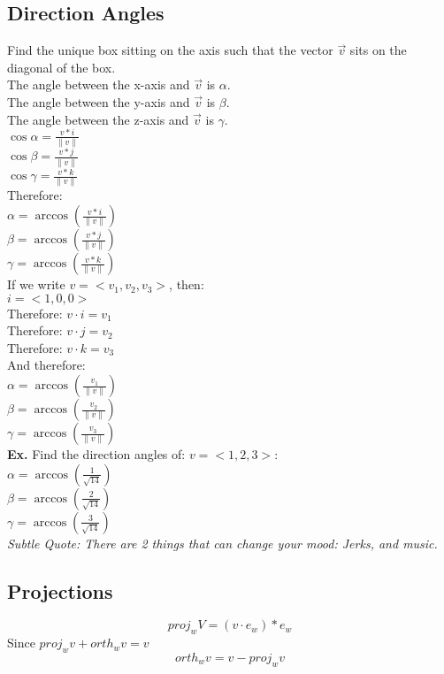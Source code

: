 \documentclass[]{article}
\begin{document}
\subsection{Direction Angles}
Find the unique box sitting on the axis such that the vector $\overrightarrow{v}$ sits on the diagonal of the box.\\
The angle between the x-axis and $\overrightarrow{v}$ is $\alpha$.\\
The angle between the y-axis and $\overrightarrow{v}$ is $\beta$.\\
The angle between the z-axis and $\overrightarrow{v}$ is $\gamma$.\\
$\cos\alpha = \frac{v * i}{\|v\|}$\\
$\cos\beta = \frac{v * j}{\|v\|}$\\
$\cos\gamma = \frac{v * k}{\|v\|}$\\
Therefore:\\
$\alpha = \arccos(\frac{v * i}{\|v\|})$\\
$\beta = \arccos(\frac{v * j}{\|v\|})$\\
$\gamma = \arccos(\frac{v * k}{\|v\|})$\\

If we write $v = <v_1, v_2, v_3>$, then:\\
$i = <1, 0, 0>$\\
Therefore: $v\cdot i = v_1$\\
Therefore: $v\cdot j = v_2$\\
Therefore: $v\cdot k = v_3$\\
And therefore:\\
$\alpha = \arccos(\frac{v_1}{\|v\|})$\\
$\beta = \arccos(\frac{v_2}{\|v\|})$\\
$\gamma = \arccos(\frac{v_3}{\|v\|})$\\

\textbf{Ex.} Find the direction angles of: $v = <1,2,3>$:\\
$\alpha = \arccos(\frac{1}{\sqrt{14}})$\\
$\beta = \arccos(\frac{2}{\sqrt{14}})$\\
$\gamma = \arccos(\frac{3}{\sqrt{14}})$\\

\textit{Subtle Quote: There are 2 things that can change your mood: Jerks, and music.\\}
\newpage
\subsection{Projections}
\begin{equation*}
    proj_w V = (v\cdot e_w) * e_w
\end{equation*}
Since $proj_w v + orth_w v = v$
\begin{equation*}
    orth_w v = v - proj_w v
\end{equation*}
\end{document}
